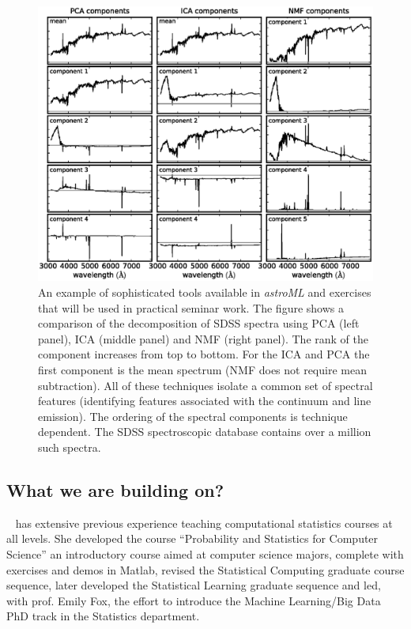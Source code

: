 \begin{figure}[!t]
\vskip -1.8in
\includegraphics[width=1.02\hsize,clip]{astroML2.eps}
\vskip -2.0in
\caption{An example of sophisticated tools available in {\it astroML} and exercises that will be
used in practical seminar work. The figure shows a comparison of the decomposition of SDSS 
spectra using PCA (left panel), ICA (middle panel) and NMF (right panel). The rank of the component
increases from top to bottom. For the ICA and PCA the first component is the mean spectrum (NMF 
does not require mean subtraction). All of these techniques isolate a common set of spectral features 
(identifying features associated with the continuum and line emission). The ordering of the spectral 
components is technique dependent. The SDSS spectroscopic database contains over a million
such spectra.} 
\label{Fig:astroML2}
\end{figure}


\subsection{What we are building on?}
\label{sec:precursors}

\meila~ has extensive previous experience teaching computational
statistics courses at all levels. She developed the
course ``Probability and Statistics for Computer Science'' an
introductory course aimed at computer science majors, complete with exercises and demos in Matlab, revised the Statistical Computing graduate course sequence, later developed the Statistical Learning graduate sequence and led, with prof. Emily Fox, 
the effort to introduce the Machine Learning/Big Data PhD track in the Statistics department. 

